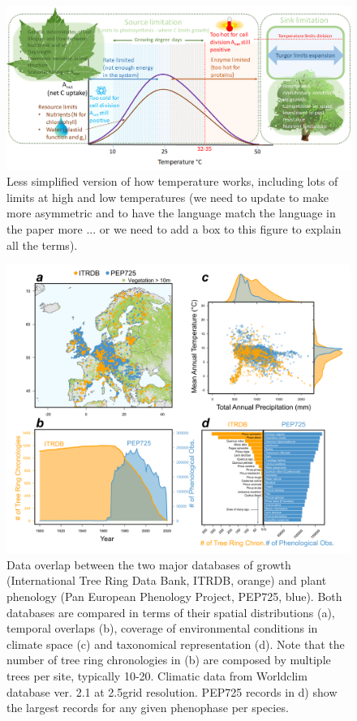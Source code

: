 \documentclass[11pt]{article}
\begin{document}
\clearpage
\begin{figure}[h!]
\includegraphics[width=1\textwidth]{..//figures/grephonfig.png}
\caption{Less simplified version of how temperature works, including lots of limits at high and low temperatures (we need to update to make more asymmetric and to have the language match the language in the paper more ... or we need to add a box to this figure to explain all the terms).}
\label{fig:temperaturecomplex}
\end{figure}

\clearpage
\begin{figure}[h!]
\includegraphics[width=1\textwidth]{..//figures/itrdbpep.png}
\caption{Data overlap between the two major databases of growth (International Tree Ring Data Bank, ITRDB, orange) and plant phenology (Pan European Phenology Project, PEP725, blue). Both databases are compared in terms of their spatial distributions (a), temporal overlaps (b), coverage of environmental conditions in climate space (c) and taxonomical representation (d). Note that the number of tree ring chronologies in (b) are composed by multiple trees per site, typically 10-20. Climatic data from Worldclim database ver. 2.1 at 2.5\degree grid resolution. PEP725 records in d) show the largest records for any given phenophase per species.}
\label{fig:itrbdpep}
\end{figure}
\end{document}
